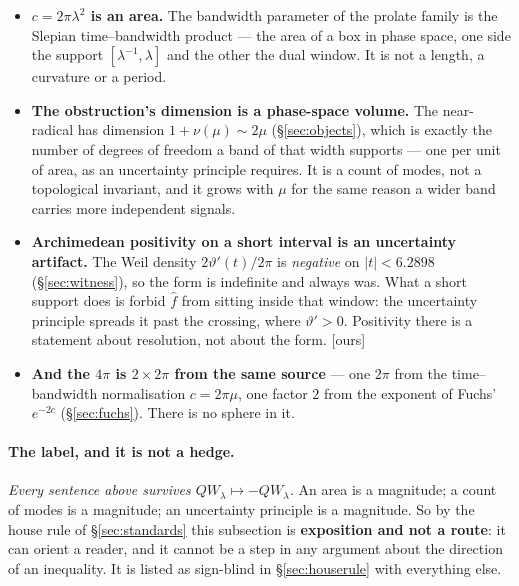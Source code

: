\documentclass[11pt,a4paper]{article}
\theoremstyle{plain}
\theoremstyle{definition}
\theoremstyle{remark}
\newcommand{\ours}{{\normalfont\sffamily\footnotesize[ours]}}
\newcommand{\R}{\mathbb{R}}
\newcommand{\Z}{\mathbb{Z}}
\newcommand{\Q}{\mathbb{Q}}
\newcommand{\A}{\mathbb{A}}
\newcommand{\E}{\mathcal{E}}
\newcommand{\F}{\mathcal{F}}
\newcommand{\QW}{QW}
\def\QW{QW}\def\E{E}\def\F{F}\def\R{R}\def\Q{Q}\def\Z{Z}\def\A{A}%
\begin{document}
\begin{itemize}\itemsep2pt
\item \textbf{$c=2\pi\lambda^2$ is an area.}  The bandwidth parameter of the
prolate family is the Slepian time--bandwidth product --- the area of a box in
phase space, one side the support $[\lambda^{-1},\lambda]$ and the other the
dual window.  It is not a length, a curvature or a period.
\item \textbf{The obstruction's dimension is a phase-space volume.}  The
near-radical has dimension $1+\nu(\mu)\sim2\mu$
(\S\ref{sec:objects}), which is exactly the number of degrees of freedom a band
of that width supports --- one per unit of area, as an uncertainty principle
requires.  It is a count of modes, not a topological invariant, and it grows
with $\mu$ for the same reason a wider band carries more independent signals.
\item \textbf{Archimedean positivity on a short interval is an uncertainty
artifact.}  The Weil density $2\vartheta'(t)/2\pi$ is \emph{negative} on
$|t|<6.2898$ (\S\ref{sec:witness}), so the form is indefinite and always was.
What a short support does is forbid $\widehat f$ from sitting inside that
window: the uncertainty principle spreads it past the crossing, where
$\vartheta'>0$.  Positivity there is a statement about resolution, not about the
form.  \ours
\item \textbf{And the $4\pi$ is $2\times2\pi$ from the same source} --- one
$2\pi$ from the time--bandwidth normalisation $c=2\pi\mu$, one factor $2$ from
the exponent of Fuchs' $e^{-2c}$ (\S\ref{sec:fuchs}).  There is no sphere in it.
\end{itemize}

\paragraph{The label, and it is not a hedge.}  \emph{Every sentence above
survives $\QW_\lambda\mapsto-\QW_\lambda$.}  An area is a magnitude; a count of
modes is a magnitude; an uncertainty principle is a magnitude.  So by the house
rule of \S\ref{sec:standards} this subsection is \textbf{exposition and not a
route}: it can orient a reader, and it cannot be a step in any argument about
the direction of an inequality.  It is listed as sign-blind in
\S\ref{sec:houserule} with everything else.
\end{document}
